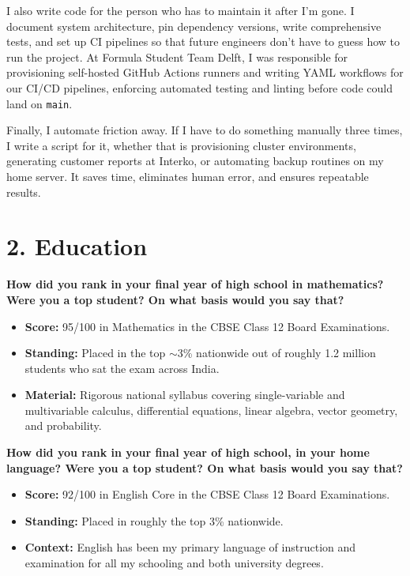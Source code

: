 \documentclass[letterpaper,11pt]{article}
\newcommand{\interviewQuestion}[1]{%
  \vspace{8pt}%
  \textbf{\color{airforceblue}#1}\par%
}
\begin{document}
I also write code for the person who has to maintain it after I'm gone. I document system architecture, pin dependency versions, write comprehensive tests, and set up CI pipelines so that future engineers don't have to guess how to run the project. At Formula Student Team Delft, I was responsible for provisioning self-hosted GitHub Actions runners and writing YAML workflows for our CI/CD pipelines, enforcing automated testing and linting before code could land on \texttt{main}.

Finally, I automate friction away. If I have to do something manually three times, I write a script for it, whether that is provisioning cluster environments, generating customer reports at Interko, or automating backup routines on my home server. It saves time, eliminates human error, and ensures repeatable results.

\vspace{10pt}
\section*{2. Education}

\interviewQuestion{How did you rank in your final year of high school in mathematics? Were you a top student? On what basis would you say that?}

\begin{itemize}[leftmargin=0.2in, itemsep=3pt]
    \item \textbf{Score:} 95/100 in Mathematics in the CBSE Class 12 Board Examinations.
    \item \textbf{Standing:} Placed in the top $\sim$3\% nationwide out of roughly 1.2 million students who sat the exam across India.
    \item \textbf{Material:} Rigorous national syllabus covering single-variable and multivariable calculus, differential equations, linear algebra, vector geometry, and probability.
\end{itemize}

\interviewQuestion{How did you rank in your final year of high school, in your home language? Were you a top student? On what basis would you say that?}

\begin{itemize}[leftmargin=0.2in, itemsep=3pt]
    \item \textbf{Score:} 92/100 in English Core in the CBSE Class 12 Board Examinations.
    \item \textbf{Standing:} Placed in roughly the top 3\% nationwide.
    \item \textbf{Context:} English has been my primary language of instruction and examination for all my schooling and both university degrees.
\end{itemize}
\end{document}
